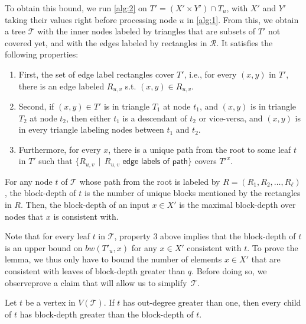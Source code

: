 \documentclass[10pt,a4paper]{article}
\theoremstyle{definition}
\theoremstyle{remark}
\theoremstyle{example}
\theoremstyle{plain}
\newcommand{\calR}{\mathcal{R}}
\newcommand{\calT}{\mathcal{T}}
\newcommand{\threshold}{q}
\begin{document}
    To obtain this bound, we run \autoref{alg:2} on $T' = (X'\times Y')\cap T_u$, with $X'$ and $Y'$ taking their values right before processing node $u$ in \autoref{alg:1}. From this, we obtain a tree $\calT$ with the inner nodes labeled by triangles that are subsets of $T'$ not covered yet, and with the edges labeled by rectangles in $\calR$. It satisfies the following properties: 
    \begin{enumerate}
        \item First, the set of edge label rectangles cover $T'$, i.e., for every $(x,y)$ in $T'$, there is an edge labeled $R_{u,v}$ s.t. $(x,y) \in R_{u,v}$. \item Second, if $(x,y) \in T'$ is in triangle $T_1$ at node $t_1$, and $(x,y)$ is in triangle $T_2$ at node $t_2$, then either $t_1$ is a descendant of $t_2$ or vice-versa, and $(x,y)$ is in every triangle labeling nodes between $t_1$ and $t_2$. \item Furthermore, for every $x$, there is a unique path from the root to some leaf $t$ in $T'$ such that $\{R_{u,v}\,\mid \, R_{u,v}\textsf{ edge labels of path}\}$ covers $T'^x$. 
    \end{enumerate}
    

    For any node $t$ of $\calT$ whose path from the root is labeled by $R = (R_1,R_2,\dots,R_\ell)$, the block-depth of $t$ is the number of unique blocks mentioned by the rectangles in $R$. Then, the block-depth of an input $x\in X'$ is the maximal block-depth over nodes that $x$ is consistent with.
    
    Note that for every leaf $t$ in $\calT$, property 3 above implies that the block-depth of $t$ is an upper bound on $bw(T'_u,x)$ for any $x\in X'$ consistent with $t$. To prove the lemma, we thus only have to bound the number of elements $x\in X'$ that are consistent with leaves of block-depth greater than $\threshold$. Before doing so, we 
{observe}{prove} a claim that will allow us to simplify~$\calT$.
    \begin{claim}
        Let $t$ be a vertex in $V(\calT)$. If $t$ has out-degree greater than one, then every child of $t$ has block-depth greater than the block-depth of $t$.
    \end{claim}
\end{document}
